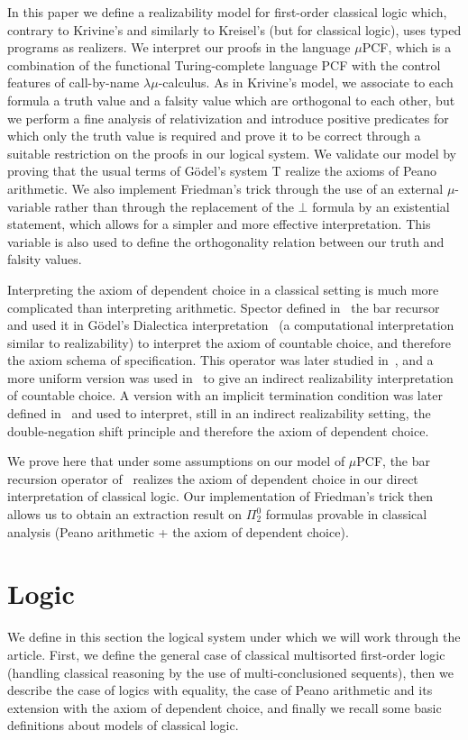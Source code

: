 \documentclass{CSML}
\newcommand*\LogBot\bot
\begin{document}
In this paper we define a realizability model for first-order classical logic which, contrary to Krivine's and similarly to Kreisel's (but for classical logic), uses typed programs as realizers. We interpret our proofs in the language $\mu$PCF, which is a combination of the functional Turing-complete language PCF with the control features of call-by-name $\lambda\mu$-calculus.  As in Krivine's model, we associate to each formula a truth value and a falsity value which are orthogonal to each other, but we perform a fine analysis of relativization and introduce positive predicates for which only the truth value is required and prove it to be correct through a suitable restriction on the proofs in our logical system. We validate our model by proving that the usual terms of G\"odel's system T realize the axioms of Peano arithmetic. We also implement Friedman's trick through the use of an external $\mu$-variable rather than through the replacement of the $\LogBot$ formula by an existential statement, which allows for a simpler and more effective interpretation. This variable is also used to define the orthogonality relation between our truth and falsity values.\par
Interpreting the axiom of dependent choice in a classical setting is much more complicated than interpreting arithmetic. Spector defined in~\cite{Spector} the bar recursor and used it in G\"odel's Dialectica interpretation~\cite{GodelDialectica} (a computational interpretation similar to realizability) to interpret the axiom of countable choice, and therefore the axiom schema of specification. This operator was later studied in~\cite{KohlenbachThesis}, and a more uniform version was used in~\cite{BerardiBezemCoquand} to give an indirect realizability interpretation of countable choice. A version with an implicit termination condition was later defined in~\cite{BergerOlivaChoice} and used to interpret, still in an indirect realizability setting, the double-negation shift principle and therefore the axiom of dependent choice.\par
We prove here that under some assumptions on our model of $\mu$PCF, the bar recursion operator of~\cite{BergerOlivaChoice} realizes the axiom of dependent choice in our direct interpretation of classical logic. Our implementation of Friedman's trick then allows us to obtain an extraction result on $\Pi^0_2$ formulas provable in classical analysis (Peano arithmetic + the axiom of dependent choice).
\section{Logic}
\label{logic}
We define in this section the logical system under which we will work through the article. First, we define the general case of classical multisorted first-order logic (handling classical reasoning by the use of multi-conclusioned sequents), then we describe the case of logics with equality, the case of Peano arithmetic and its extension with the axiom of dependent choice, and finally we recall some basic definitions about models of classical logic.
\end{document}
